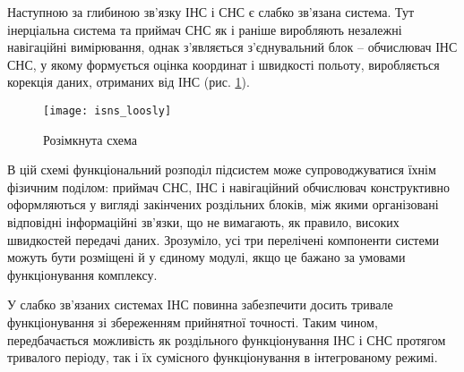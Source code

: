 Наступною за глибиною зв'язку ІНС і СНС є слабко зв'язана система. Тут інерціальна 
система та приймач СНС як і раніше виробляють незалежні навігаційні вимірювання, 
однак з'являється з'єднувальний блок -- обчислювач ІНС СНС, у якому формується оцінка 
координат і швидкості польоту, виробляється корекція даних, отриманих від ІНС (рис. 
\ref{fig:isns_loosly}).

\begin{figure}[here]
\centering
\texttt{[image: isns\_loosly]}
\caption{Розімкнута схема}
\label{fig:isns_loosly}
\end{figure}

В цій схемі функціональний розподіл підсистем може супроводжуватися їхнім фізичним 
поділом: приймач СНС, ІНС і навігаційний обчислювач конструктивно оформляються у 
вигляді закінчених роздільних блоків, між якими організовані відповідні інформаційні 
зв'язки, що не вимагають, як правило, високих швидкостей передачі даних. Зрозуміло, 
усі три перелічені компоненти системи можуть бути розміщені й у єдиному модулі, якщо 
це бажано за умовами функціонування комплексу.

У слабко зв'язаних системах ІНС повинна забезпечити досить тривале функціонування 
зі  збереженням прийнятної точності.  Таким  чином, передбачається можливість як 
роздільного функціонування ІНС і СНС протягом тривалого періоду, так і їх сумісного 
функціонування в інтегрованому режимі. 

